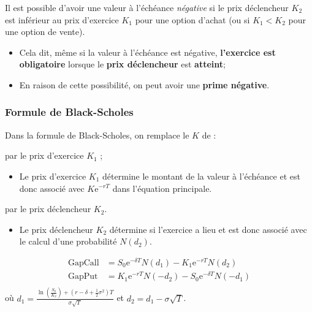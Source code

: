 \documentclass[10pt, french]{article}
\begin{document}
\begin{multicols*}{2}
\begin{definitionNOHFILLsub}[]
\begin{center}
\begin{tikzpicture}[x=0.75pt,y=0.75pt,yscale=-1,xscale=1]
\end{tikzpicture}
\end{center}
\end{definitionNOHFILLsub}

Il est possible d'avoir une valeur à l'échéance \textit{négative} si le prix déclencheur $K_{2}$ est inférieur au prix d'exercice $K_{1}$ pour une option d'achat (ou si $K_{1} < K_{2}$ pour une option de vente).
\begin{itemize}
	\item	Cela dit, même si la valeur à l'échéance est négative, \textbf{l'exercice est obligatoire} lorsque le \textbf{prix déclencheur} est \textbf{atteint};
	\item	En raison de cette possibilité, on peut avoir une \textbf{prime négative}.
\end{itemize}


\subsubsection*{Formule de Black-Scholes}
Dans la formule de Black-Scholes, on remplace le $K$ de :
\begin{description}[font = \itshape]
	\item[l'équation principale]	par le prix d'exercice $K_{1}$ ;
		\begin{itemize}
		\item	Le prix d'exercice $K_{1}$ détermine le montant de la valeur à l'échéance et est donc associé avec $K\textrm{e}^{-rT}$ dans l'équation principale.
		\end{itemize}
	\item[$d_{1}$]	par le prix déclencheur $K_{2}$.
		\begin{itemize}
		\item	Le prix déclencheur $K_{2}$ détermine si l'exercice a lieu et est donc associé avec le calcul d'une probabilité $N(d_{2})$.
		\end{itemize}
\end{description}

\begin{align*}
	\text{GapCall}
	&=	S_{0} \textrm{e}^{- \delta T} N(d_{1}) - K_{1}\textrm{e}^{-rT} N(d_{2})	\\
	\text{GapPut}
	&=	K_{1}\textrm{e}^{-rT} N(-d_{2}) - S_{0}\textrm{e}^{-\delta T}N(-d_{1})	\\
\end{align*}
où $d_{1}	=	\frac{\ln\left(\frac{S_{0}}{K_{2}}\right) + \left( r - \delta + \frac{1}{2} \sigma^{2} \right)T}{\sigma \sqrt{T}}$ et $d_{2}	=	d_{1} - \sigma \sqrt{T}$.



\end{multicols*}
\end{document}
